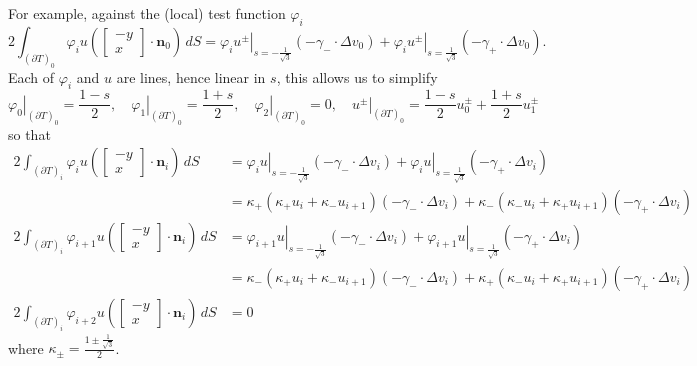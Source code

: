 \documentclass[letterpaper,10pt]{article}
\begin{document}
For example, against the (local) test function \(\varphi_i\)
\[2 \int_{\left(\partial T\right)_0} \varphi_i u
\left(\left[ \begin{array}{c} -y \\ x \end{array}\right]
\cdot \mathbf{n}_0\right) \, dS =
\left.\varphi_i u^{\pm} \right|_{s=-\frac{1}{\sqrt{3}}}
\left(-\gamma_{-} \cdot \Delta v_0\right) +
\left.\varphi_i u^{\pm} \right|_{s=\frac{1}{\sqrt{3}}}
\left(-\gamma_{+} \cdot \Delta v_0\right).\]
Each of \(\varphi_i\) and \(u\) are lines, hence linear in
\(s\), this allows us to simplify
\[\left.\varphi_0\right|_{\left(\partial T\right)_0} =
\frac{1 - s}{2}, \quad
\left.\varphi_1\right|_{\left(\partial T\right)_0} =
\frac{1 + s}{2}, \quad
\left.\varphi_2\right|_{\left(\partial T\right)_0} = 0, \quad
\left.u^{\pm}\right|_{\left(\partial T\right)_0} =
\frac{1 - s}{2} u_0^{\pm} + \frac{1 + s}{2} u_1^{\pm}\]
so that
\begin{align*}
2 \int_{\left(\partial T\right)_i} \varphi_i u
\left(\left[ \begin{array}{c} -y \\ x \end{array}\right]
\cdot \mathbf{n}_i\right) \, dS &=
\left.\varphi_i u \right|_{s=-\frac{1}{\sqrt{3}}}
\left(-\gamma_{-} \cdot \Delta v_i\right) +
\left.\varphi_i u \right|_{s=\frac{1}{\sqrt{3}}}
\left(-\gamma_{+} \cdot \Delta v_i\right) \\
&= \kappa_{+} \left(\kappa_{+} u_i + \kappa_{-} u_{i + 1}\right)
\left(-\gamma_{-} \cdot \Delta v_i\right) +
\kappa_{-} \left(\kappa_{-} u_i + \kappa_{+} u_{i + 1}\right)
\left(-\gamma_{+} \cdot \Delta v_i\right) \\
2 \int_{\left(\partial T\right)_i} \varphi_{i + 1} u
\left(\left[ \begin{array}{c} -y \\ x \end{array}\right]
\cdot \mathbf{n}_i\right) \, dS &=
\left.\varphi_{i + 1} u \right|_{s=-\frac{1}{\sqrt{3}}}
\left(-\gamma_{-} \cdot \Delta v_i\right) +
\left.\varphi_{i + 1} u \right|_{s=\frac{1}{\sqrt{3}}}
\left(-\gamma_{+} \cdot \Delta v_i\right) \\
&= \kappa_{-} \left(\kappa_{+} u_i + \kappa_{-} u_{i + 1}\right)
\left(-\gamma_{-} \cdot \Delta v_i\right) +
\kappa_{+} \left(\kappa_{-} u_i + \kappa_{+} u_{i + 1}\right)
\left(-\gamma_{+} \cdot \Delta v_i\right) \\
2 \int_{\left(\partial T\right)_i} \varphi_{i + 2} u
\left(\left[ \begin{array}{c} -y \\ x \end{array}\right]
\cdot \mathbf{n}_i\right) \, dS &= 0
\end{align*}
where \(\kappa_{\pm} = \frac{1 \pm \frac{1}{\sqrt{3}}}{2}\).
\end{document}
